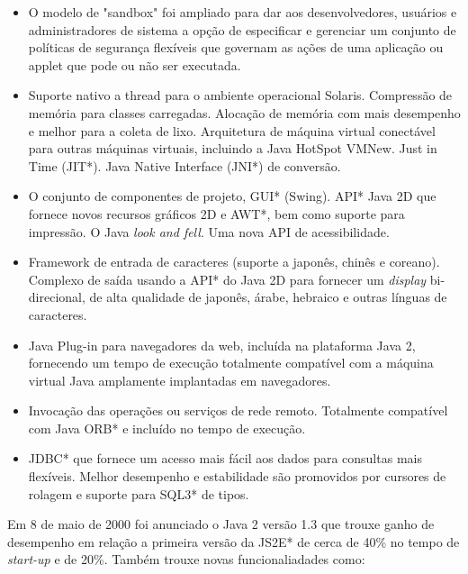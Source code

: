 	\begin{itemize}
	  \item O modelo de "sandbox"  foi ampliado para dar aos desenvolvedores, usuários e administradores de sistema a opção de especificar e gerenciar um conjunto de políticas de segurança flexíveis que governam as ações de uma aplicação ou applet que pode ou não ser executada.
	  \item Suporte nativo a thread para o ambiente operacional Solaris. Compressão de memória para classes carregadas. Alocação de memória com mais desempenho e melhor para a coleta de lixo. Arquitetura de máquina virtual conectável para outras máquinas virtuais, incluindo a Java HotSpot VMNew. Just in Time (JIT*). Java Native Interface (JNI*) de conversão.
	  \item O conjunto de componentes de projeto, GUI* (Swing). API* Java 2D que fornece novos recursos gráficos 2D e AWT*, bem como suporte para impressão. O Java {\it look and fell}. Uma nova API de acessibilidade.
	  \item Framework de entrada de caracteres (suporte a japonês, chinês e coreano). Complexo de saída usando a API* do Java 2D para fornecer um {\it display} bi-direcional, de alta qualidade de japonês, árabe, hebraico e outras línguas de caracteres.
	  \item Java Plug-in para navegadores da web, incluída na plataforma Java 2, fornecendo um tempo de execução totalmente compatível com a máquina virtual Java amplamente implantadas em navegadores.
	  \item Invocação das operações ou serviços de rede remoto. Totalmente compatível com Java ORB* e incluído no tempo de execução.
	  \item JDBC* que fornece um acesso mais fácil aos dados para consultas mais flexíveis. Melhor desempenho e estabilidade são promovidos por cursores de rolagem e suporte para SQL3* de tipos.\\
	\end{itemize}

	Em 8 de maio de 2000 foi anunciado o Java 2 versão 1.3 que trouxe ganho de desempenho em relação a primeira versão da JS2E* de cerca de 40\%  no tempo de {\it  start-up} e de 20\%. Também trouxe novas funcionaliadades como: 

